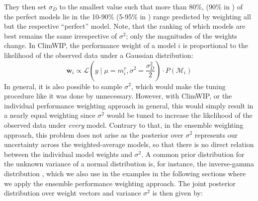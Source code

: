They then set $\sigma_D$ to the smallest value such that more than 80\%, (90\% in \citep{knuttiClimateModelProjection2017})  of the perfect models lie in the 10-90\% (5-95\% in \citep{knuttiClimateModelProjection2017}) range predicted by weighting all but the respective ``perfect'' model.
Note, that the ranking of which models are best remains the same irrespective of $\sigma^2$; only the magnitudes of the weights change.
In ClimWIP, the performance weight of a model $i$ is proportional to the likelihood of the observed data under a Gaussian distribution:
\begin{equation}
    \mathbf{w}_i \propto \mathcal{L}(y \mid \mu=m_i^v, \sigma^2 = \frac{\sigma_D^2}{2}) \cdot P(\mathcal{M}_i)
\end{equation}
%
In general, it is also possible to sample $\sigma^2$, which would make the tuning procedure like it was done by  \citet{brunnerReducedGlobalWarming2020}  unnecessary. However, with ClimWIP, or the individual performance weighting approach in general, this would simply result in a nearly equal weighting since $\sigma^2$ would be tuned to increase the likelihood of the observed data under \emph{every} model. Contrary to that, in the ensemble weighting approach, this problem does not arise as the posterior over $\sigma^2$ represents our uncertainty across the weighted-average models, so that there is no direct relation between the individual model weights and $\sigma^2$. A common prior distribution for the unknown variance of a normal distribution is, for instance, the inverse-gamma distribution \citep[e.g., see][Ch.2.6]{gelmanBayesianDataAnalysis2013}, which we also use in the examples in the following sections where we apply the ensemble performance weighting approach. The joint posterior distribution over weight vectors and variance $\sigma^2$ is then given by:
